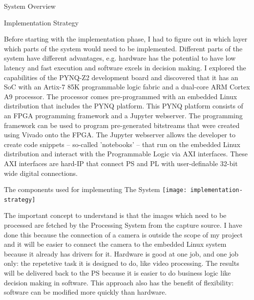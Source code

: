 \documentclass{matthijs}
\begin{document}
\begin{hoofdstuk}{System Overview}
		\begin{paragraaf}{Implementation Strategy}

			Before starting with the implementation phase, I had to figure out in which layer which parts of the system would need to be implemented.
			Different parts of the system have different advantages, e.g. hardware has the potential to have low latency and fast execution and software excels in decision making.
			I explored the capabilities of the PYNQ-Z2 development board and discovered that it has an SoC with an Artix-7 85K programmable logic fabric and a dual-core ARM Cortex A9 processor.
			The processor comes pre-programmed with an embedded Linux distribution that includes the PYNQ platform.
			This PYNQ platform consists of an FPGA programming framework and a Jupyter webserver.
			The programming framework can be used to program pre-generated bitstreams that were created using Vivado onto the FPGA.
			The Jupyter webserver allows the developer to create code snippets -- so-called 'notebooks' -- that run on the embedded Linux distribution and interact with the Programmable Logic via AXI interfaces.
			These AXI interfaces are hard-IP that connect PS and PL with user-definable 32-bit wide digital connections.
		
			\vspace{-0.6ex}
			\begin{figuur}{The components used for implementing The System}
				\singlespacing
				\texttt{[image: implementation-strategy]}
				\onehalfspacing
			\end{figuur}
			\vspace{-0.2ex}

			The important concept to understand is that the images which need to be processed are fetched by the Processing System from the capture source.
			I have done this because the connection of a camera is outside the scope of my project and it will be easier to connect the camera to the embedded Linux system because it already has drivers for it.
			Hardware is good at one job, and one job only: the repetetive task it is designed to do, like video processing.
			The results will be delivered back to the PS because it is easier to do business logic like decision making in software.
			This approach also has the benefit of flexibility: software can be modified more quickly than hardware.


		\end{paragraaf}

	\end{hoofdstuk}
\end{document}
